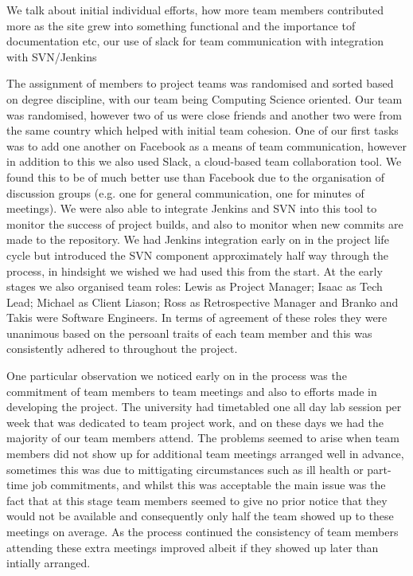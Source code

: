 \documentclass{l3proj}
\begin{document}
We talk about initial individual efforts, how more team members contributed more as the site grew into something functional
and the importance tof documentation etc, our use of slack for team communication with integration with SVN/Jenkins

The assignment of members to project teams was randomised and sorted based on degree discipline, with our team being
Computing Science oriented. Our team was randomised, however two of us were close friends and another two were from the
same country which helped with initial team cohesion. One of our first tasks was to add one another on Facebook as a means of
team communication, however in addition to this we also used Slack, a cloud-based team collaboration tool. We found this to
be of much better use than Facebook due to the organisation of discussion groups (e.g. one for general communication, one for
minutes of meetings). We were also able to integrate Jenkins and SVN into this tool to monitor the success of project builds,
and also to monitor when new commits are made to the repository. We had Jenkins integration early on in the project life cycle
but introduced the SVN component approximately half way through the process, in hindsight we wished we had used this from the
start. At the early stages we also organised team roles: Lewis as Project Manager; Isaac as Tech Lead; Michael as Client Liason;
Ross as Retrospective Manager and Branko and Takis were Software Engineers. In terms of agreement of these roles they were unanimous
based on the persoanl traits of each team member and this was consistently adhered to throughout the project.

One particular observation we noticed early on in the process was the commitment of team members to team meetings and also
to efforts made in developing the project. The university had timetabled one all day lab session per week that was dedicated
to team project work, and on these days we had the majority of our team members attend. The problems seemed to arise when
team members did not show up for additional team meetings arranged well in advance, sometimes this was due to mittigating
circumstances such as ill health or part-time job commitments, and whilst this was acceptable the main issue was the fact
that at this stage team members seemed to give no prior notice that they would not be available and consequently only
half the team showed up to these meetings on average. As the process continued the consistency of team members attending these
extra meetings improved albeit if they showed up later than intially arranged.
\end{document}
